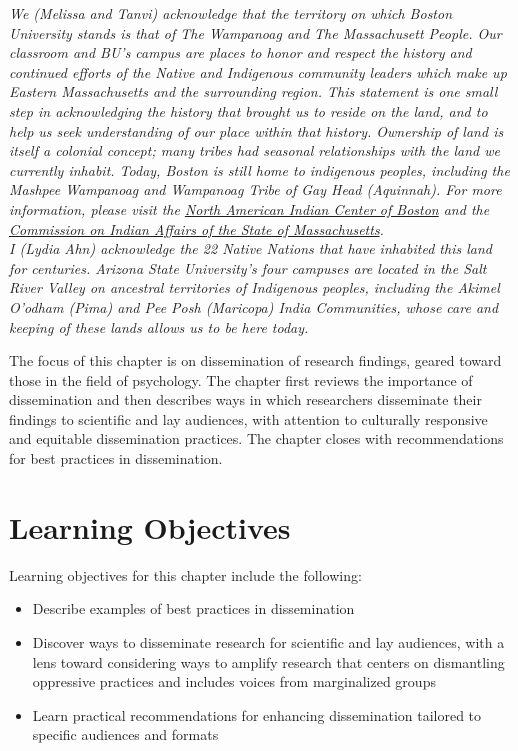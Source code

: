\documentclass[
  11pt,
]{book}
\providecommand{\tightlist}{%
  \setlength{\itemsep}{0pt}\setlength{\parskip}{0pt}}
\begin{document}
\emph{We (Melissa and Tanvi) acknowledge that the territory on which Boston University stands is that of The Wampanoag and The Massachusett People. Our classroom and BU's campus are places to honor and respect the history and continued efforts of the Native and Indigenous community leaders which make up Eastern Massachusetts and the surrounding region. This statement is one small step in acknowledging the history that brought us to reside on the land, and to help us seek understanding of our place within that history. Ownership of land is itself a colonial concept; many tribes had seasonal relationships with the land we currently inhabit. Today, Boston is still home to indigenous peoples, including the Mashpee Wampanoag and Wampanoag Tribe of Gay Head (Aquinnah). For more information, please visit the \href{http://www.naicob.org/}{North American Indian Center of Boston} and the \href{https://www.mass.gov/service-details/indian-affairs}{Commission on Indian Affairs of the State of Massachusetts}.}\\

\emph{I (Lydia Ahn) acknowledge the 22 Native Nations that have inhabited this land for centuries. Arizona State University's four campuses are located in the Salt River Valley on ancestral territories of Indigenous peoples, including the Akimel O'odham (Pima) and Pee Posh (Maricopa) India Communities, whose care and keeping of these lands allows us to be here today.}~

The focus of this chapter is on dissemination of research findings, geared toward those in the field of psychology. The chapter first reviews the importance of dissemination and then describes ways in which researchers disseminate their findings to scientific and lay audiences, with attention to culturally responsive and equitable dissemination practices. The chapter closes with recommendations for best practices in dissemination.

\section{Learning Objectives}\label{learning-objectives-4}

Learning objectives for this chapter include the following:

\begin{itemize}
\tightlist
\item
  Describe examples of best practices in dissemination
\item
  Discover ways to disseminate research for scientific and lay audiences, with a lens toward considering ways to amplify research that centers on dismantling oppressive practices and includes voices from marginalized groups
\item
  Learn practical recommendations for enhancing dissemination tailored to specific audiences and formats
\end{itemize}
\end{document}
